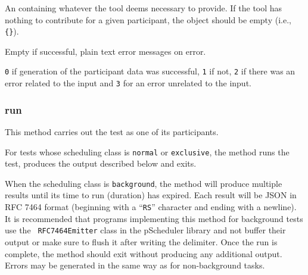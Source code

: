 \documentclass[10pt,titlepage]{article}
\begin{document}
 An  containing
whatever the tool deems necessary to provide.  If the tool has nothing
to contribute for a given participant, the object should be empty
(i.e., {\tt \{\}}).

 Empty if successful, plain text error
messages on error.

 {\tt 0} if generation of the participant
data was successful, {\tt 1} if not, {\tt 2} if there was an error
related to the input and {\tt 3} for an error unrelated to the input.



\subsubsection{run}\label{toolrun}
This method carries out the test as one of its participants.

For tests whose scheduling class is {\tt normal} or {\tt exclusive},
the method runs the test, produces the output described below and exits.

When the scheduling class is {\tt background}, the method will produce
multiple results until its time to run (duration) has expired.  Each
result will be JSON in RFC 7464 format (beginning with a ``{\tt RS}''
character and ending with a newline).  It is recommended that programs
implementing this method for background tests use the {\tt
  RFC7464Emitter} class in the pScheduler library and not buffer their
output or make sure to flush it after writing the delimiter.  Once the
run is complete, the method should exit without producing any
additional output.  Errors may be generated in the same way as for
non-background tasks.


\end{document}
